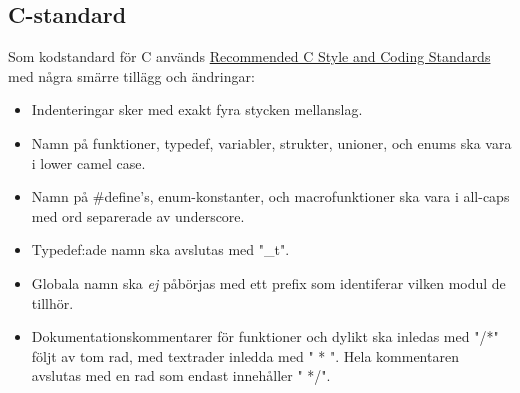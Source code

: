 \documentclass[a4paper,11pt]{article}
\begin{document}
\begin{appendices}
\section{C-standard} \label{sec:cstandard}
Som kodstandard för C används \href{https://www.doc.ic.ac.uk/lab/cplus/cstyle.html}{Recommended C Style and Coding Standards} med några smärre tillägg och ändringar:

\begin{itemize}
    \item Indenteringar sker med exakt fyra stycken mellanslag.
    \item Namn på funktioner, typedef, variabler, strukter, unioner, och enums ska vara i lower camel case.
    \item Namn på \#define's, enum-konstanter, och macrofunktioner ska vara i all-caps med ord separerade av underscore.
    \item Typedef:ade namn ska avslutas med "\_t".
    \item Globala namn ska \textit{ej} påbörjas med ett prefix som identiferar vilken modul de tillhör.
    \item Dokumentationskommentarer för funktioner och dylikt ska inledas med "/*" följt av tom rad, med textrader inledda med "{ }* ". Hela kommentaren avslutas med en rad som endast innehåller "{ }*/".
\end{itemize}

\end{appendices}
\end{document}
